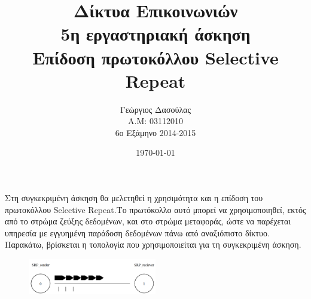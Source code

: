 \documentclass{article}%
\begin{document}

\title{Δίκτυα Επικοινωνιών\\5η εργαστηριακή άσκηση\\ 
Επίδοση πρωτοκόλλου \textlatin{Selective Repeat}}
\author{Γεώργιος Δασούλας\\Α.Μ: 03112010 \\ 6ο Εξάμηνο 2014-2015  }
\date{\today}
\maketitle

Στη συγκεκριμένη άσκηση θα μελετηθεί η χρησιμότητα και η επίδοση του πρωτοκόλλου \textlatin{Selective Repeat}.Το πρωτόκολλο αυτό
μπορεί να χρησιμοποιηθεί, εκτός από το στρώμα ζεύξης δεδομένων, και στο στρώμα μεταφοράς, ώστε να
παρέχεται υπηρεσία με εγγυημένη παράδοση δεδομένων πάνω από αναξιόπιστο δίκτυο. Παρακάτω, βρίσκεται η τοπολογία που χρησιμοποιείται για τη συγκεκριμένη άσκηση.
\begin{figure}[htbp]
	\centering
		\includegraphics[width=0.50\textwidth]{1.png}
	\label{fig:1}
\end{figure}
\end{document}
